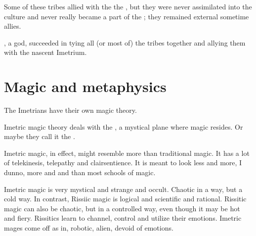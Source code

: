Some of these tribes allied with the the \Ortaicans, but they were never assimilated into the \Ortaican{} culture and never really became a part of the \bacconate; they remained external sometime allies. 

, a \nycan{} god, succeeded in tying all (or most of) the tribes together and allying them with the nascent Imetrium. 









\section{Magic and metaphysics}
The Imetrians have their own magic theory. 

Imetric magic theory deals with the , a mystical plane where magic resides.
Or maybe they call it the . 

Imetric magic, in effect, might resemble  more than traditional magic. 
It has a lot of telekinesis, telepathy and clairsentience. 
It is meant to look less  and more, I dunno, more  and  and  than most schools of magic. 

Imetric magic is very mystical and strange and occult. Chaotic in a way, but a cold way.
In contrast, Rissiic magic is logical and scientific and rational.
Rissitic magic can also be chaotic, but in a controlled way, even though it may be hot and fiery.
Rissitics learn to channel, control and utilize their emotions.
Imetric mages come off as in\human, robotic, alien, devoid of emotions.






